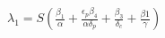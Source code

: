 \documentclass[preview]{standalone}
\begin{document}
\begin{center}
$\lambda_1 = S ( \frac{\beta_1}{\alpha} + \frac{\epsilon_p \beta_4}{\alpha \delta_p} + \frac{\beta_3}{\delta_c} + \frac{\beta1}{\gamma} )$
\end{center}
\end{document}
